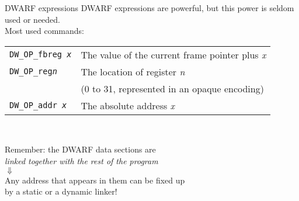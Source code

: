\begin{frame}{DWARF expressions}
DWARF expressions are powerful, but this power is seldom used or needed.\\
\smallskip
Most used commands:\\
\medskip
\begin{tabular}{ l l }
\texttt{DW\_OP\_fbreg \textit{x}} & The value of the current frame pointer plus \textit{x} \\
\texttt{DW\_OP\_reg\textit{n}} & The location of register \textit{n} \\
& (0 to 31, represented in an opaque encoding) \\
\texttt{DW\_OP\_addr \textit{x}} & The absolute address \textit{x} \\
\end{tabular}\\
\bigskip
\begin{center}
Remember: the DWARF data sections are\\\emph{linked together with the rest of the program}\\
$\Downarrow$\\
Any address that appears in them can be fixed up\\by a static or a dynamic linker!
\end{center}
\end{frame}



